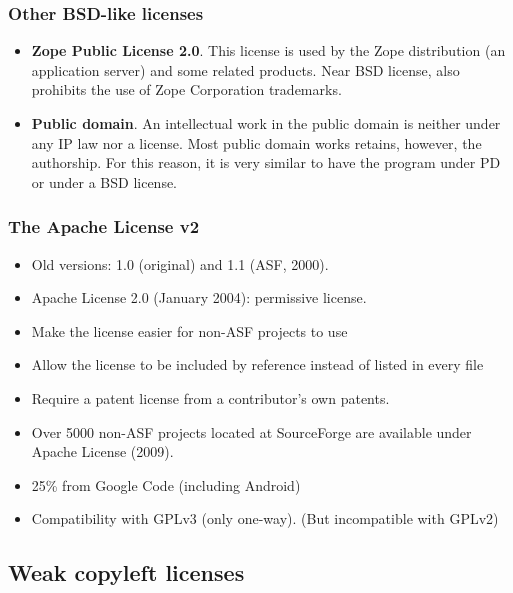 \begin{frame}
\frametitle{Other BSD-like licenses}

{\small
\begin{itemize}

\item {\bf Zope Public License 2.0}. This license is used by the Zope
  distribution (an application server) and some related products. Near
  BSD license, also prohibits the use of Zope Corporation trademarks.

\item {\bf Public domain}. An intellectual work in the public domain
  is neither under any IP law nor a license. Most public domain works
  retains, however, the authorship. For this reason, it is very
  similar to have the program under PD or under a BSD license.

\end{itemize}
}

\end{frame}



\begin{frame}
\frametitle{The Apache License v2}

\begin{itemize}
\item Old versions: 1.0 (original) and 1.1 (ASF, 2000).
\item Apache License 2.0 (January 2004): permissive license.
\item Make the license easier for non-ASF projects to use
\item Allow the license to be included by reference instead of listed in every file
\item Require a patent license from a contributor's own patents.
\item Over 5000 non-ASF projects located at SourceForge are available under Apache License (2009). 
\item 25\% from Google Code (including Android)
\item Compatibility with GPLv3 (only one-way). (But incompatible with GPLv2)

\end{itemize}

\end{frame}

\subsection{Weak copyleft licenses}

